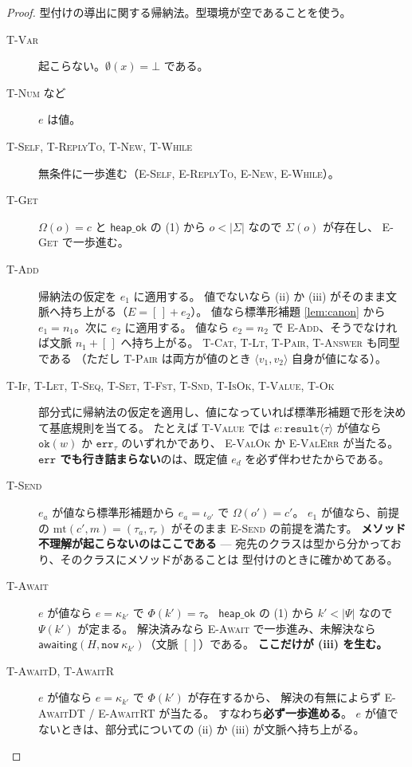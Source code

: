 \documentclass[11pt,a4paper]{ltjsarticle}
\theoremstyle{definition}
\theoremstyle{remark}
\newcommand{\tres}[1]{\ensuremath{\mathtt{result}\langle #1 \rangle}}
\newcommand{\Om}{\Omega}
\newcommand{\Sm}{\Sigma}
\newcommand{\Ph}{\Phi}
\newcommand{\Ps}{\Psi}
\newcommand{\mtab}{\mathrm{mt}}
\newcommand{\heapok}{\textsf{heap\_ok}}
\newcommand{\awaiting}{\textsf{awaiting}}
\begin{document}
\begin{proof}
型付けの導出に関する帰納法。型環境が空であることを使う。
\begin{description}
\item[\textsc{T-Var}] 起こらない。$\emptyset(x) = \bot$ である。
\item[\textsc{T-Num} など] $e$ は値。
\item[\textsc{T-Self}, \textsc{T-ReplyTo}, \textsc{T-New}, \textsc{T-While}]
  無条件に一歩進む（\textsc{E-Self}, \textsc{E-ReplyTo}, \textsc{E-New}, \textsc{E-While}）。
\item[\textsc{T-Get}] $\Om(o) = c$ と $\heapok$ の (1) から $o < |\Sm|$ なので $\Sm(o)$ が存在し、
  \textsc{E-Get} で一歩進む。
\item[\textsc{T-Add}] 帰納法の仮定を $e_1$ に適用する。
  値でないなら (ii) か (iii) がそのまま文脈へ持ち上がる（$E = [\,] + e_2$）。
  値なら標準形補題 \ref{lem:canon} から $e_1 = n_1$。次に $e_2$ に適用する。
  値なら $e_2 = n_2$ で \textsc{E-Add}、そうでなければ文脈 $n_1 + [\,]$ へ持ち上がる。
  \textsc{T-Cat}, \textsc{T-Lt}, \textsc{T-Pair}, \textsc{T-Answer} も同型である
  （ただし \textsc{T-Pair} は両方が値のとき $\langle v_1,v_2\rangle$ 自身が値になる）。
\item[\textsc{T-If}, \textsc{T-Let}, \textsc{T-Seq}, \textsc{T-Set}, \textsc{T-Fst},
      \textsc{T-Snd}, \textsc{T-IsOk}, \textsc{T-Value}, \textsc{T-Ok}]
  部分式に帰納法の仮定を適用し、値になっていれば標準形補題で形を決めて基底規則を当てる。
  たとえば \textsc{T-Value} では $e : \tres{\tau}$ が値なら
  $\mathtt{ok}(w)$ か $\mathtt{err}_\tau$ のいずれかであり、
  \textsc{E-ValOk} か \textsc{E-ValErr} が当たる。
  \textbf{$\mathtt{err}$ でも行き詰まらない}のは、既定値 $e_d$ を必ず伴わせたからである。
\item[\textsc{T-Send}] $e_a$ が値なら標準形補題から $e_a = \iota_{o'}$ で $\Om(o') = c'$。
  $e_1$ が値なら、前提の $\mtab(c',m) = (\tau_a,\tau_r)$ がそのまま
  \textsc{E-Send} の前提を満たす。
  \textbf{メソッド不理解が起こらないのはここである} ---
  宛先のクラスは型から分かっており、そのクラスにメソッドがあることは
  型付けのときに確かめてある。
\item[\textsc{T-Await}] $e$ が値なら $e = \kappa_{k'}$ で $\Ph(k') = \tau$。
  $\heapok$ の (1) から $k' < |\Ps|$ なので $\Ps(k')$ が定まる。
  解決済みなら \textsc{E-Await} で一歩進み、未解決なら
  $\awaiting(H, \mathtt{now}\ \kappa_{k'})$（文脈 $[\,]$）である。
  \textbf{ここだけが (iii) を生む。}
\item[\textsc{T-AwaitD}, \textsc{T-AwaitR}] $e$ が値なら $e = \kappa_{k'}$ で $\Ph(k')$ が存在するから、
  解決の有無によらず \textsc{E-AwaitDT} / \textsc{E-AwaitRT} が当たる。
  すなわち\textbf{必ず一歩進める}。
  $e$ が値でないときは、部分式についての (ii) か (iii) が文脈へ持ち上がる。
\end{description}
\end{proof}
\end{document}

